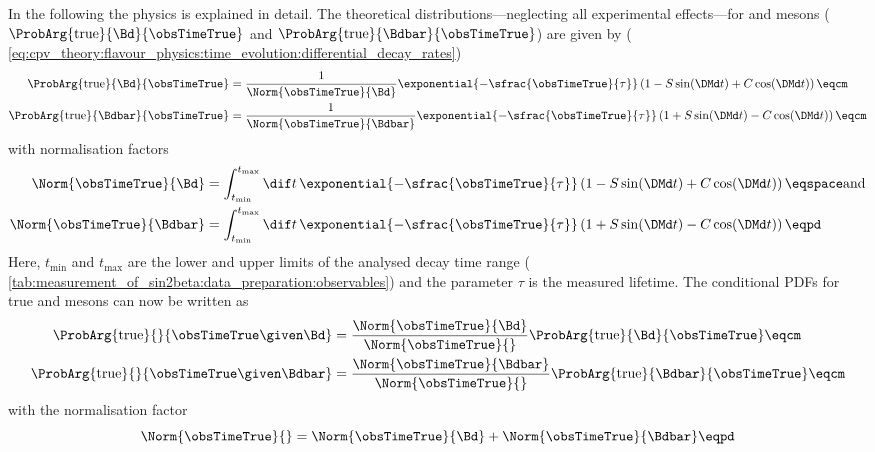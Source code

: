 In the following the \B physics \PDF is explained in detail. The theoretical
distributions---neglecting all experimental effects---for \Bd and \Bdbar mesons
($\ProbArg{\text{true}}{\Bd}{\obsTimeTrue}$ and
$\ProbArg{\text{true}}{\Bdbar}{\obsTimeTrue}$) are given by (\cf
\cref{eq:cpv_theory:flavour_physics:time_evolution:differential_decay_rates})
%
\begin{equation}
  \begin{split}
    \ProbArg{\text{true}}{\Bd}{\obsTimeTrue}    &= \frac{1}{\Norm{\obsTimeTrue}{\Bd}}    \exponential{-\sfrac{\obsTimeTrue}{\tau}} \left( 1 - S \sin(\DMd t) + C \cos (\DMd t) \right)\eqcm \\
    \ProbArg{\text{true}}{\Bdbar}{\obsTimeTrue} &= \frac{1}{\Norm{\obsTimeTrue}{\Bdbar}} \exponential{-\sfrac{\obsTimeTrue}{\tau}} \left( 1 + S \sin(\DMd t) - C \cos (\DMd t) \right)\eqcm
  \end{split}
\end{equation}
%
with normalisation factors
%
\begin{equation}
  \begin{split}
    \Norm{\obsTimeTrue}{\Bd}    &= \int_{t_\text{min}}^{t_\text{max}} \dif t \, \exponential{-\sfrac{\obsTimeTrue}{\tau}} \left( 1 - S \sin (\DMd t) + C \cos (\DMd t) \right)\eqspace\text{and} \\
    \Norm{\obsTimeTrue}{\Bdbar} &= \int_{t_\text{min}}^{t_\text{max}} \dif t \, \exponential{-\sfrac{\obsTimeTrue}{\tau}} \left( 1 + S \sin (\DMd t) - C \cos (\DMd t) \right)\eqpd
  \end{split}
\end{equation}
%
Here, $t_\text{min}$ and $t_\text{max}$ are the lower and upper limits of the
analysed decay time range (\cf
\cref{tab:measurement_of_sin2beta:data_preparation:observables}) and the parameter $\tau$ is the measured \Bd
lifetime. The conditional \acp{PDF} for true \Bd and \Bdbar mesons can now be
written as
%
\begin{equation}
  \begin{split}
    \ProbArg{\text{true}}{}{\obsTimeTrue\given\Bd}    &= \frac{\Norm{\obsTimeTrue}{\Bd}}{\Norm{\obsTimeTrue}{}}    \ProbArg{\text{true}}{\Bd}{\obsTimeTrue}\eqcm \\
    \ProbArg{\text{true}}{}{\obsTimeTrue\given\Bdbar} &= \frac{\Norm{\obsTimeTrue}{\Bdbar}}{\Norm{\obsTimeTrue}{}} \ProbArg{\text{true}}{\Bdbar}{\obsTimeTrue}\eqcm
  \end{split}
\end{equation}
%
with the normalisation factor
%
\begin{equation}
  \Norm{\obsTimeTrue}{} = \Norm{\obsTimeTrue}{\Bd} + \Norm{\obsTimeTrue}{\Bdbar}\eqpd
\end{equation}
